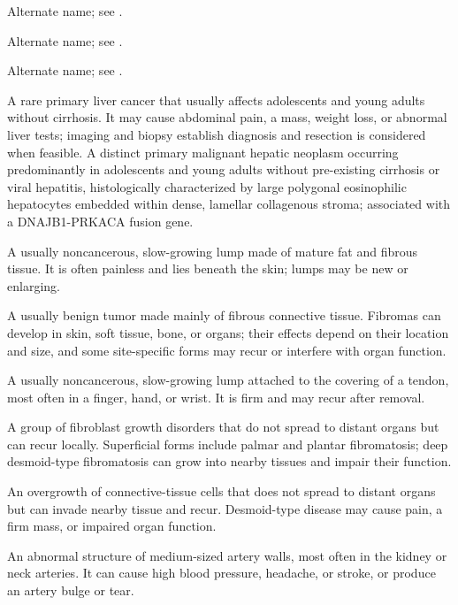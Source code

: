  Alternate name; see .

 Alternate name; see .

 Alternate name; see .

 A rare primary liver cancer that usually affects adolescents and young adults without cirrhosis. It may cause abdominal pain, a mass, weight loss, or abnormal liver tests; imaging and biopsy establish diagnosis and resection is considered when feasible.
 A distinct primary malignant hepatic neoplasm occurring predominantly in adolescents and young adults without pre-existing cirrhosis or viral hepatitis, histologically characterized by large polygonal eosinophilic hepatocytes embedded within dense, lamellar collagenous stroma; associated with a DNAJB1-PRKACA fusion gene.

 A usually noncancerous, slow-growing lump made of mature fat and fibrous tissue. It is often painless and lies beneath the skin; lumps may be new or enlarging.

 A usually benign tumor made mainly of fibrous connective tissue. Fibromas can develop in skin, soft tissue, bone, or organs; their effects depend on their location and size, and some site-specific forms may recur or interfere with organ function.

 A usually noncancerous, slow-growing lump attached to the covering of a tendon, most often in a finger, hand, or wrist. It is firm and may recur after removal.


 A group of fibroblast growth disorders that do not spread to distant organs but can recur locally. Superficial forms include palmar and plantar fibromatosis; deep desmoid-type fibromatosis can grow into nearby tissues and impair their function.

 An overgrowth of connective-tissue cells that does not spread to distant organs but can invade nearby tissue and recur. Desmoid-type disease may cause pain, a firm mass, or impaired organ function.

 An abnormal structure of medium-sized artery walls, most often in the kidney or neck arteries. It can cause high blood pressure, headache, or stroke, or produce an artery bulge or tear.


